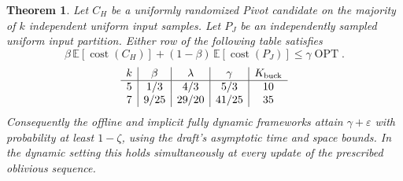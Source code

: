 \documentclass[11pt]{article}
\newtheorem{theorem}{Theorem}[section]
\begin{document}
\begin{theorem}\label{thm:centered-finite}
Let $C_H$ be a uniformly randomized Pivot candidate on the majority
of $k$ independent uniform input samples. Let $P_J$ be an independently
sampled uniform input partition. Either row of the following table
satisfies
\[
 \beta\,\mathbb E[\operatorname{cost}(C_H)]
 +(1-\beta)\,\mathbb E[\operatorname{cost}(P_J)]
 \le\gamma\operatorname{OPT}.
\]
\[
\begin{array}{c|c|c|c|c}
 k&\beta&\lambda&\gamma&K_{\rm buck}\\\hline
 5&1/3&4/3&5/3&10\\
 7&9/25&29/20&41/25&35
\end{array}
\]
Consequently the offline and implicit fully dynamic frameworks attain
$\gamma+\varepsilon$ with probability at least $1-\zeta$, using the
draft's asymptotic time and space bounds. In the dynamic setting this
holds simultaneously at every update of the prescribed oblivious
sequence.
\end{theorem}
\end{document}
